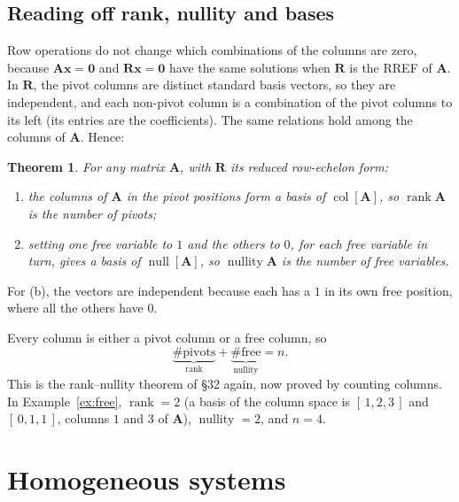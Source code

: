 \documentclass[11pt]{article}
\theoremstyle{plain}
\newtheorem{thm}{Theorem}[section]
\theoremstyle{definition}
\theoremstyle{remark}
\newcommand{\vc}[1]{\mathbf{#1}}
\newcommand{\mt}[1]{\mathbf{#1}}
\newcommand{\colsp}[1]{\operatorname{col}[#1]}
\newcommand{\nullsp}[1]{\operatorname{null}[#1]}
\DeclareMathOperator{\rank}{rank}
\DeclareMathOperator{\nullity}{nullity}
\begin{document}
\subsection{Reading off rank, nullity and bases}
Row operations do not change which combinations of the columns are zero, because
$\mt{A}\vc{x}=\vc{0}$ and $\mt{R}\vc{x}=\vc{0}$ have the same solutions when $\mt{R}$ is
the RREF of $\mt{A}$. In $\mt{R}$, the pivot columns are distinct standard basis
vectors, so they are independent, and each non-pivot column is a combination of the
pivot columns to its left (its entries are the coefficients). The same relations
hold among the columns of $\mt{A}$. Hence:

\begin{thm}
\label{thm:pivots}
For any matrix $\mt{A}$, with $\mt{R}$ its reduced row-echelon form:
\begin{enumerate}[label=(\alph*),leftmargin=2em,itemsep=2pt]
  \item the columns of $\mt{A}$ in the pivot positions form a basis of
        $\colsp{\mt{A}}$, so $\rank\mt{A}$ is the number of pivots;
  \item setting one free variable to $1$ and the others to $0$, for each free
        variable in turn, gives a basis of $\nullsp{\mt{A}}$, so
        $\nullity\mt{A}$ is the number of free variables.
\end{enumerate}
\end{thm}

\noindent For (b), the vectors are independent because each has a $1$ in its own
free position, where all the others have $0$.

Every column is either a pivot column or a free column, so
\[
  \underbrace{\#\text{pivots}}_{\rank}+\underbrace{\#\text{free}}_{\nullity}=n .
\]
This is the rank--nullity theorem of \S32 again, now proved by counting columns.
In Example~\ref{ex:free}, $\rank=2$ (a basis of the column space is
$[\,1,2,3\,]$ and $[\,0,1,1\,]$, columns $1$ and $3$ of $\mt{A}$), $\nullity=2$,
and $n=4$.

\section{Homogeneous systems}
\end{document}
